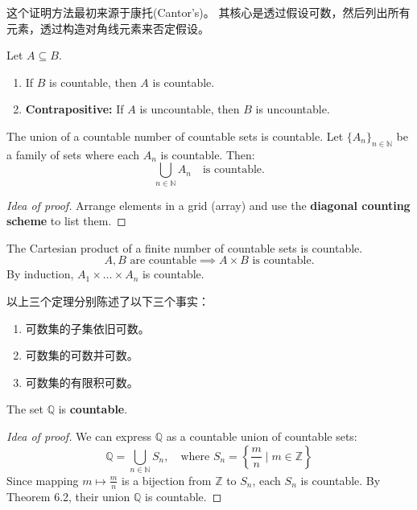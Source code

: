 \documentclass[
	UTF-8,
	11pt, %
	a4paper, %
]{LegrandOrangeBook}
\begin{document}
    \begin{remark}
        这个证明方法最初来源于康托(Cantor's)。
        其核心是透过假设可数，然后列出所有元素，透过构造对角线元素来否定假设。
    \end{remark}

    \newpage

    \begin{theorem}
    Let $A \subseteq B$.
    \begin{enumerate}
        \item If $B$ is countable, then $A$ is countable.
        \item \textbf{Contrapositive:} If $A$ is uncountable, then $B$ is uncountable.
    \end{enumerate}
    \end{theorem}

    \begin{theorem}
    The union of a countable number of countable sets is countable.
    Let $\{ A_n \}_{n \in \mathbb{N}}$ be a family of sets where each $A_n$ is countable. Then:
    \[ \bigcup_{n \in \mathbb{N}} A_n \quad \text{is countable.} \]
    \end{theorem}
    \begin{proof}[Idea of proof]
    Arrange elements in a grid (array) and use the \textbf{diagonal counting scheme} to list them.
    \end{proof}

    \begin{theorem}
    The Cartesian product of a finite number of countable sets is countable.
    \[ A, B \text{ are countable} \implies A \times B \text{ is countable.} \]
    By induction, $A_1 \times \dots \times A_n$ is countable.
    \end{theorem}

    \begin{remark}
        以上三个定理分别陈述了以下三个事实：
        \begin{enumerate}
            \item 可数集的子集依旧可数。
            \item 可数集的可数并可数。
            \item 可数集的有限积可数。
        \end{enumerate}
    \end{remark}

    \begin{example}
    The set $\mathbb{Q}$ is \textbf{countable}.
    \begin{proof}[Idea of proof]
    We can express $\mathbb{Q}$ as a countable union of countable sets:
    \[ \mathbb{Q} = \bigcup_{n \in \mathbb{N}} S_n, \quad \text{where } S_n = \left\{ \frac{m}{n} \mid m \in \mathbb{Z} \right\} \]
    Since mapping $m \mapsto \frac{m}{n}$ is a bijection from $\mathbb{Z}$ to $S_n$, each $S_n$ is countable. By Theorem 6.2, their union $\mathbb{Q}$ is countable.
    \end{proof}
    \end{example}
\end{document}
